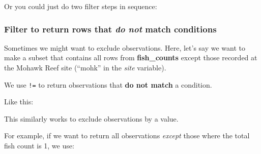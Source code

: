 \documentclass[]{book}
\newenvironment{Shaded}{\begin{snugshade}}{\end{snugshade}}
\newcommand{\CommentTok}[1]{\textcolor[rgb]{0.56,0.35,0.01}{\textit{#1}}}
\newcommand{\KeywordTok}[1]{\textcolor[rgb]{0.13,0.29,0.53}{\textbf{#1}}}
\newcommand{\NormalTok}[1]{#1}
\newcommand{\OperatorTok}[1]{\textcolor[rgb]{0.81,0.36,0.00}{\textbf{#1}}}
\newcommand{\StringTok}[1]{\textcolor[rgb]{0.31,0.60,0.02}{#1}}
\begin{document}
Or you could just do two filter steps in sequence:

\begin{Shaded}
\end{Shaded}

\hypertarget{filter-to-return-rows-that-do-not-match-conditions}{%
\subsubsection{\texorpdfstring{Filter to return rows that \emph{do not} match conditions}{Filter to return rows that do not match conditions}}\label{filter-to-return-rows-that-do-not-match-conditions}}

Sometimes we might want to exclude observations. Here, let's say we want to make a subset that contains all rows from \textbf{fish\_counts} except those recorded at the Mohawk Reef site (``mohk'' in the \emph{site} variable).

We use \texttt{!=} to return observations that \textbf{do not match} a condition.

Like this:

\begin{Shaded}
\end{Shaded}

This similarly works to exclude observations by a value.

For example, if we want to return all observations \emph{except} those where the total fish count is 1, we use:
\end{document}
